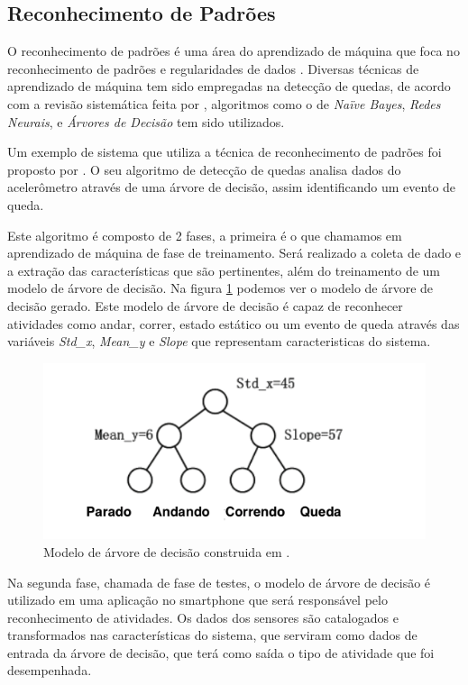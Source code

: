 \subsection{Reconhecimento de Padrões}
O reconhecimento de padrões é uma área do aprendizado de máquina que foca no reconhecimento de padrões e regularidades de dados \citep{anzai2012pattern}. Diversas técnicas de aprendizado de máquina tem sido empregadas na detecção de quedas, de acordo com a revisão sistemática feita por \cite{casilari2015analysis}, algoritmos como o de \textit{Naïve Bayes}, \textit{Redes Neurais}, e \textit{Árvores de Decisão} tem sido utilizados.


Um exemplo de sistema que utiliza a técnica de reconhecimento de padrões foi proposto por \cite{zhao2012fallalarm}. O seu algoritmo de detecção de quedas analisa dados do acelerômetro através de uma árvore de decisão, assim identificando um evento de queda. 

Este algoritmo é composto de 2 fases, a primeira é o que chamamos em aprendizado de máquina de fase de treinamento. Será realizado a coleta de dado e a  extração das características que são pertinentes, além do treinamento de um modelo de árvore de decisão. Na figura \ref{fig:decision_tree} podemos ver o modelo de árvore de decisão gerado.  Este modelo de árvore de decisão é capaz de reconhecer atividades como andar, correr, estado estático ou um evento de queda através das variáveis \textit{Std\_x}, \textit{Mean\_y} e \textit{Slope} que representam caracteristicas do sistema. 


\begin{figure}[ht]
	\centering
	\includegraphics[scale=0.6]{imagens/decision_tree.png}
	\caption{ Modelo de árvore de decisão construida em \cite{zhao2012fallalarm}.}
	\label{fig:decision_tree}
\end{figure} 


Na segunda fase, chamada de fase de testes, o modelo de árvore de decisão é utilizado em uma aplicação no smartphone que será responsável pelo reconhecimento de atividades. Os dados dos sensores são catalogados e transformados nas características do sistema, que serviram como dados de entrada da árvore de decisão, que terá como saída o tipo de atividade que foi desempenhada.

